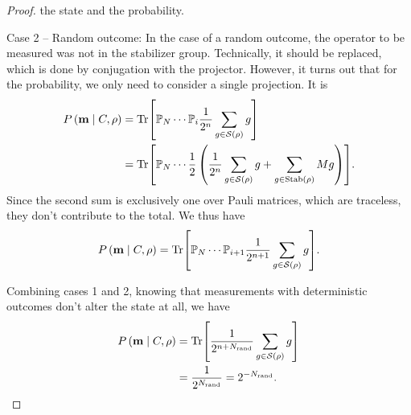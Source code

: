 \begin{proof}
the state and the probability.
\par{Case 2 -- Random outcome:}
In the case of a random outcome, the operator to be measured was not in the
stabilizer group. Technically, it should be replaced, which is done by
conjugation with the projector. However, it turns out that for the probability,
we only need to consider a single projection. It is
\begin{align}
  P\left(\mathbf{m} \mid C, \rho\right) 
  &= \Tr[ \mathbb{P}_N \cdots \mathbb{P}_i \frac{1}{2^n}\sum_{g \in
  \mathcal{S}(\rho)} g]\nonumber\\
  &= \Tr[ \mathbb{P}_N \cdots \frac{1}{2} \left(\frac{1}{2^n} \sum_{g \in
  \mathcal{S}(\rho)} g + \sum_{g \in \mathrm{Stab}(\rho)} Mg\right) ]
.\end{align}
Since the second sum is exclusively one over Pauli matrices, which are traceless,
they don't contribute to the total. We thus have
\begin{align}
  P\left(\mathbf{m} \mid C, \rho\right) 
  = \Tr[\mathbb{P}_N \cdots \mathbb{P}_{i+1} \frac{1}{2^{n+1}}
  \sum_{g\in\mathcal{S}(\rho)} g]
.\end{align}

Combining cases 1 and 2, knowing that measurements with deterministic outcomes
don't alter the state at all, we have
\begin{align}
  P\left(\mathbf{m} \mid C, \rho\right) 
  &= \Tr[\frac{1}{2^{n+N_\mathrm{rand}}} \sum_{g\in\mathcal{S}(\rho)}
  g]\nonumber\\
  &= \frac{1}{2^{N_\mathrm{rand}}} = 2^{-N_\mathrm{rand}}
.\end{align}
%
\end{proof}

